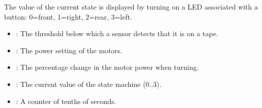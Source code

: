 The value of the current state is displayed by turning on a LED
associated with a button: 0=front, 1=right, 2=rear, 3=left.



\begin{itemize}
\item {}: The threshold below which a sensor detects that it
is on a tape.

\item {}: The power setting of the motors.

\item {}: The percentage change in the motor power when turning.
\end{itemize}


\begin{itemize}
\item {}: The current value of the state machine (0..3). 
\item {}:  A counter of tenths of seconds.

\end{itemize}


